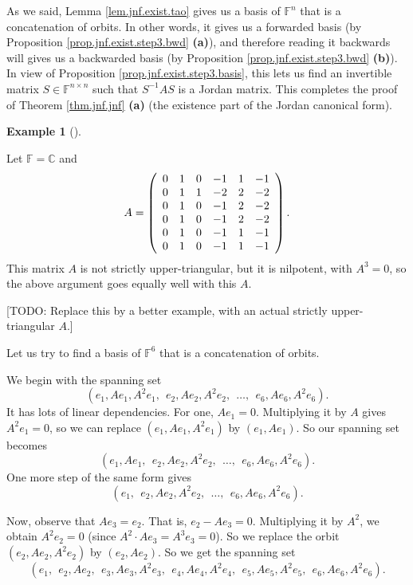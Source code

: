 \documentclass[numbers=enddot,12pt,final,onecolumn,notitlepage]{scrartcl}%
\numberwithin{exer}{subsection}
\theoremstyle{definition}
\newtheorem{exam}[theo]{Example}
\newenvironment{example}[1][]
{\begin{exam}[#1]\begin{leftbar}}
{\end{leftbar}\end{exam}}
\begin{document}
As we said, Lemma \ref{lem.jnf.exist.tao} gives us a basis of $\mathbb{F}^{n}$
that is a concatenation of orbits. In other words, it gives us a forwarded
basis (by Proposition \ref{prop.jnf.exist.step3.bwd} \textbf{(a)}), and
therefore reading it backwards will gives us a backwarded basis (by
Proposition \ref{prop.jnf.exist.step3.bwd} \textbf{(b)}). In view of
Proposition \ref{prop.jnf.exist.step3.basis}, this lets us find an invertible
matrix $S\in\mathbb{F}^{n\times n}$ such that $S^{-1}AS$ is a Jordan matrix.
This completes the proof of Theorem \ref{thm.jnf.jnf} \textbf{(a)} (the
existence part of the Jordan canonical form).

\begin{example}
Let $\mathbb{F}=\mathbb{C}$ and
\[
A=\left(
\begin{array}
[c]{cccccc}%
0 & 1 & 0 & -1 & 1 & -1\\
0 & 1 & 1 & -2 & 2 & -2\\
0 & 1 & 0 & -1 & 2 & -2\\
0 & 1 & 0 & -1 & 2 & -2\\
0 & 1 & 0 & -1 & 1 & -1\\
0 & 1 & 0 & -1 & 1 & -1
\end{array}
\right)  .
\]
This matrix $A$ is not strictly upper-triangular, but it is nilpotent, with
$A^{3}=0$, so the above argument goes equally well with this $A$.

[TODO: Replace this by a better example, with an actual strictly
upper-triangular $A$.]

Let us try to find a basis of $\mathbb{F}^{6}$ that is a concatenation of orbits.

We begin with the spanning set%
\[
\left(  e_{1},Ae_{1},A^{2}e_{1},\ \ e_{2},Ae_{2},A^{2}e_{2},\ \ \ldots
,\ \ e_{6},Ae_{6},A^{2}e_{6}\right)  .
\]
It has lots of linear dependencies. For one, $Ae_{1}=0$. Multiplying it by $A$
gives $A^{2}e_{1}=0$, so we can replace $\left(  e_{1},Ae_{1},A^{2}%
e_{1}\right)  $ by $\left(  e_{1},Ae_{1}\right)  $. So our spanning set
becomes%
\[
\left(  e_{1},Ae_{1},\ \ e_{2},Ae_{2},A^{2}e_{2},\ \ \ldots,\ \ e_{6}%
,Ae_{6},A^{2}e_{6}\right)  .
\]
One more step of the same form gives%
\[
\left(  e_{1},\ \ e_{2},Ae_{2},A^{2}e_{2},\ \ \ldots,\ \ e_{6},Ae_{6}%
,A^{2}e_{6}\right)  .
\]


Now, observe that $Ae_{3}=e_{2}$. That is, $e_{2}-Ae_{3}=0$. Multiplying it by
$A^{2}$, we obtain $A^{2}e_{2}=0$ (since $A^{2}\cdot Ae_{3}=A^{3}e_{3}=0$). So
we replace the orbit $\left(  e_{2},Ae_{2},A^{2}e_{2}\right)  $ by $\left(
e_{2},Ae_{2}\right)  $. So we get the spanning set
\[
\left(  e_{1},\ \ e_{2},Ae_{2},\ \ e_{3},Ae_{3},A^{2}e_{3},\ \ e_{4}%
,Ae_{4},A^{2}e_{4},\ \ e_{5},Ae_{5},A^{2}e_{5},\ \ e_{6},Ae_{6},A^{2}%
e_{6}\right)  .
\]



\end{example}
\end{document}
